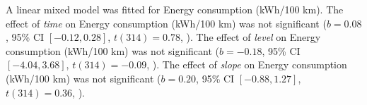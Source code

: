 A linear mixed model was fitted for Energy consumption (kWh/100 km).
The effect of \textit{time} on Energy consumption (kWh/100 km) was not significant ($b = 0.08$, 95\% CI $[-0.12, 0.28]$, $t(314) = 0.78$, ).
The effect of \textit{level} on Energy consumption (kWh/100 km) was not significant ($b = -0.18$, 95\% CI $[-4.04, 3.68]$, $t(314) = -0.09$, ).
The effect of \textit{slope} on Energy consumption (kWh/100 km) was not significant ($b = 0.20$, 95\% CI $[-0.88, 1.27]$, $t(314) = 0.36$, ).
